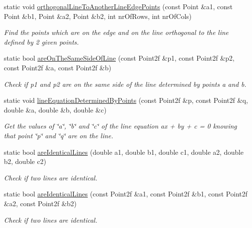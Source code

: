 \begin{DoxyCompactItemize}
static void \hyperlink{classmultiscale_1_1Geometry2D_a3da27e8cecb0a0d2733afa85d356a912}{orthogonal\-Line\-To\-Another\-Line\-Edge\-Points} (const \-Point \&a1, const \-Point \&b1, \-Point \&a2, \-Point \&b2, int nr\-Of\-Rows, int nr\-Of\-Cols)
\begin{DoxyCompactList}\small\item\em \-Find the points which are on the edge and on the line orthogonal to the line defined by 2 given points. \end{DoxyCompactList}\item 
static bool \hyperlink{classmultiscale_1_1Geometry2D_a828b7b579420ac06dabd7c4ba4d081ae}{are\-On\-The\-Same\-Side\-Of\-Line} (const \-Point2f \&p1, const \-Point2f \&p2, const \-Point2f \&a, const \-Point2f \&b)
\begin{DoxyCompactList}\small\item\em \-Check if p1 and p2 are on the same side of the line determined by points a and b. \end{DoxyCompactList}\item 
static void \hyperlink{classmultiscale_1_1Geometry2D_a6d72740d7f1b2441b0829c0f0c6a6853}{line\-Equation\-Determined\-By\-Points} (const \-Point2f \&p, const \-Point2f \&q, double \&a, double \&b, double \&c)
\begin{DoxyCompactList}\small\item\em \-Get the values of \char`\"{}a\char`\"{}, \char`\"{}b\char`\"{} and \char`\"{}c\char`\"{} of the line equation ax + by + c = 0 knowing that point \char`\"{}p\char`\"{} and \char`\"{}q\char`\"{} are on the line. \end{DoxyCompactList}\item 
static bool \hyperlink{classmultiscale_1_1Geometry2D_aaa19f84365e924bacfad4ea893875a42}{are\-Identical\-Lines} (double a1, double b1, double c1, double a2, double b2, double c2)
\begin{DoxyCompactList}\small\item\em \-Check if two lines are identical. \end{DoxyCompactList}\item 
static bool \hyperlink{classmultiscale_1_1Geometry2D_a718faf02b261c9ccbedf9d7b0e19ada1}{are\-Identical\-Lines} (const \-Point2f \&a1, const \-Point2f \&b1, const \-Point2f \&a2, const \-Point2f \&b2)
\begin{DoxyCompactList}\small\item\em \-Check if two lines are identical. \end{DoxyCompactList}\item 

\end{DoxyCompactItemize}
